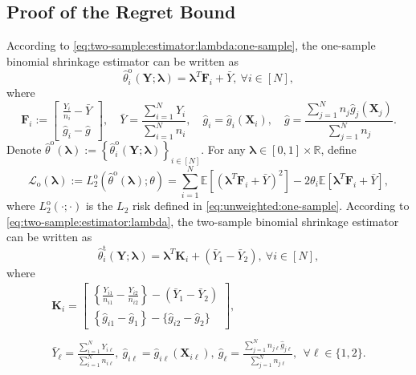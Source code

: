 \documentclass[12pt,letterpaper]{article}
\begin{document}
\subsection{Proof of the Regret Bound}
According to \eqref{eq:two-sample:estimator:lambda:one-sample}, the one-sample binomial shrinkage estimator can be written as
$$\displaystyle\hat{\theta}_i^{\mathrm{o}}(\mathbf{Y};\boldsymbol{\lambda})=\boldsymbol{\lambda}^T\mathbf{F}_i+\bar{Y},\ \forall i\in[N],$$
where 
\begin{equation}\label{eq:notation:one-sample}
\mathbf{F}_i:=\begin{bmatrix}
\displaystyle\frac{Y_i}{n_i}-\bar{Y}\\
\displaystyle\hat{g}_i-\hat{g}
\end{bmatrix},\quad \bar{Y}=\frac{\sum_{i=1}^NY_i}{\sum_{i=1}^Nn_i},\quad \hat{g}_i=\hat{g}_i(\mathbf{X}_i),\quad \hat{g}=\frac{\sum_{j=1}^Nn_j\hat{g}_j(\mathbf{X}_j)}{\sum_{j=1}^Nn_j}.
\end{equation}
Denote $\hat{\theta}^{\mathrm{o}}(\boldsymbol{\lambda}):=\left\{\hat{\theta}_i^{\mathrm{o}}(\mathbf{Y};\boldsymbol{\lambda})\right\}_{i\in[N]}$. For any $\boldsymbol{\lambda}\in[0,1]\times\mathbb{R}$, define 
\begin{equation}\label{eq:loss:lambda:one-sample}
    \mathcal{L}_{\mathrm{o}}(\boldsymbol{\lambda}):=L_2^{\mathrm{o}}\left(\hat{\theta}^{\mathrm{o}}(\boldsymbol{\lambda});\theta\right)=\sum_{i=1}^N\mathbb{E}\left[\left(\boldsymbol{\lambda}^T\mathbf{F}_i+\bar{Y}\right)^2\right]-2\theta_i\mathbb{E}\left[\boldsymbol{\lambda}^T\mathbf{F}_i+\bar{Y}\right],
\end{equation}
where $L_2^{\mathrm{o}}(\cdot;\cdot)$ is the $L_2$ risk defined in \eqref{eq:unweighted:one-sample}. According to \eqref{eq:two-sample:estimator:lambda}, the two-sample binomial shrinkage estimator can be written as 
$$\displaystyle\hat{\theta}_i^{\mathrm{t}}(\mathbf{Y};\boldsymbol{\lambda})=\boldsymbol{\lambda}^T\mathbf{K}_i+(\bar{Y}_1-\bar{Y}_2),\ \forall i\in[N],$$
where
\begin{equation}\label{eq:notation:two-sample}
\begin{array}{rcl}
&\displaystyle\mathbf{K}_i=\begin{bmatrix}
\displaystyle\left\{\frac{Y_{i1}}{n_{i1}}-\frac{Y_{i2}}{n_{i2}}\right\}-(\bar{Y}_1-\bar{Y}_2)\\
\left\{\hat{g}_{i1}-\hat{g}_1\right\}-\{\hat{g}_{i2}-\hat{g}_2\}
\end{bmatrix},&\\
\\
&\displaystyle\bar{Y}_{\ell}=\frac{\sum_{i=1}^NY_{i\ell}}{\sum_{i=1}^Nn_{i\ell}},\ \hat{g}_{i\ell}=\hat{g}_{i\ell}(\mathbf{X}_{i\ell}),\ \hat{g}_{\ell}=\frac{\sum_{j=1}^Nn_{j\ell}\hat{g}_{j\ell}}{\sum_{j=1}^Nn_{j\ell}},\ \ \forall \ell\in\{1,2\}.&
\end{array}
\end{equation}
\end{document}
